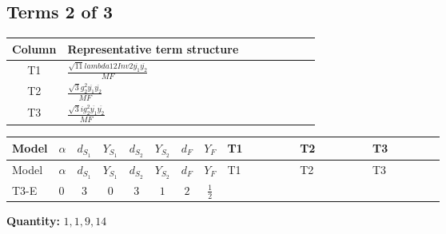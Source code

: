 \documentclass[8pt]{article}
\begin{document}
\begin{landscape}
\subsection*{Terms 2 of 3}
\begin{center}
\begin{tabular}{@{}c >{\raggedright\arraybackslash}p{0.82\linewidth}@{}}
\toprule
Column & Representative term structure \\
\midrule
T1 & \(\displaystyle \frac{\sqrt{11} lambda12Inv2 \overline{y_{1}} \overline{y_{2}}}{MF}\) \\
\midrule
T2 & \(\displaystyle \frac{\sqrt{3} g_{2}^{2} \overline{y_{1}} \overline{y_{2}}}{MF}\) \\
\midrule
T3 & \(\displaystyle \frac{\sqrt{3} i g_{2}^{2} \overline{y_{1}} \overline{y_{2}}}{MF}\) \\
\midrule
\bottomrule
\end{tabular}
\end{center}
\smallskip
\tiny
\begin{longtable}{@{}llcccccc >{\raggedright\arraybackslash}p{0.21\linewidth} >{\raggedright\arraybackslash}p{0.21\linewidth} >{\raggedright\arraybackslash}p{0.21\linewidth}@{}}
\toprule
Model & $\alpha$ & $d_{S_1}$ & $Y_{S_1}$ & $d_{S_2}$ & $Y_{S_2}$ & $d_F$ & $Y_F$ & T1 & T2 & T3 \\
\midrule
\endfirsthead
\toprule
Model & $\alpha$ & $d_{S_1}$ & $Y_{S_1}$ & $d_{S_2}$ & $Y_{S_2}$ & $d_F$ & $Y_F$ & T1 & T2 & T3 \\
\midrule
\endhead
T3-E & $0$ & $3$ & $0$ & $3$ & $1$ & $2$ & $\frac{1}{2}$ & \scriptsize\adjustbox{max width=\linewidth}{$\begin{gathered} \frac{3 \sqrt{11} lambda12Inv2 \overline{y_{1}} \overline{y_{2}}}{22 MF}\end{gathered}$} & \scriptsize\adjustbox{max width=\linewidth}{$\begin{gathered} \frac{49 \sqrt{3} g_{2}^{2} \overline{y_{1}} \overline{y_{2}}}{24 MF}\end{gathered}$} & \scriptsize\adjustbox{max width=\linewidth}{$\begin{gathered} - \frac{\sqrt{3} i g_{2}^{2} \overline{y_{1}} \overline{y_{2}}}{6 MF}\end{gathered}$} \\
\midrule
\bottomrule
\end{longtable}
\clearpage
\noindent\textbf{Quantity: }$\mathrm{1,1,9,14}$\par\smallskip

\end{landscape}
\end{document}
